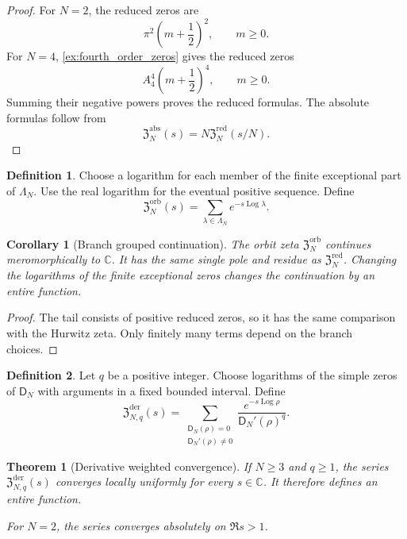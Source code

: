 \documentclass{aomart}
\newtheorem{theorem}{Theorem}[section]
\newtheorem{corollary}[corollary]{Corollary}
\theoremstyle{definition}
\newtheorem{definition}[definition]{Definition}
\theoremstyle{remark}
\newcommand{\CC}{\mathbb C}
\newcommand{\Dfun}{\mathsf D}
\newcommand{\Log}{\operatorname{Log}}
\begin{document}
\begin{proof}
For $N=2$, the reduced zeros are
\[
\pi^2\left(m+\frac12\right)^2,
\qquad m\geq0.
\]
For $N=4$, \cref{ex:fourth_order_zeros} gives the reduced zeros
\[
A_4^4\left(m+\frac12\right)^4,
\qquad m\geq0.
\]
Summing their negative powers proves the reduced formulas.  The absolute formulas follow from
\[
\mathfrak Z_N^{\mathrm{abs}}(s)
=
N\mathfrak Z_N^{\mathrm{red}}(s/N).
\]
\end{proof}

\begin{definition}\label{def:branch_orbit_zeta}
Choose a logarithm for each member of the finite exceptional part of $\Lambda_N$.  Use the real logarithm for the eventual positive sequence.  Define
\[
\mathfrak Z_N^{\mathrm{orb}}(s)
=
\sum_{\lambda\in\Lambda_N}e^{-s\Log\lambda}.
\]
\end{definition}

\begin{corollary}[Branch grouped continuation]\label{cor:branch_grouped_continuation}
The orbit zeta $\mathfrak Z_N^{\mathrm{orb}}$ continues meromorphically to $\CC$.  It has the same single pole and residue as $\mathfrak Z_N^{\mathrm{red}}$.  Changing the logarithms of the finite exceptional zeros changes the continuation by an entire function.
\end{corollary}

\begin{proof}
The tail consists of positive reduced zeros, so it has the same comparison with the Hurwitz zeta.  Only finitely many terms depend on the branch choices.
\end{proof}

\begin{definition}\label{def:derivative_weighted_zeta}
Let $q$ be a positive integer.  Choose logarithms of the simple zeros of $\Dfun_N$ with arguments in a fixed bounded interval.  Define
\[
\mathfrak Z_{N,q}^{\mathrm{der}}(s)
=
\sum_{\substack{\Dfun_N(\rho)=0\\ \Dfun_N'(\rho)\ne0}}
\frac{e^{-s\Log\rho}}{\Dfun_N'(\rho)^q}.
\]
\end{definition}

\begin{theorem}[Derivative weighted convergence]\label{thm:derivative_weighted_convergence}
If $N\geq3$ and $q\geq1$, the series $\mathfrak Z_{N,q}^{\mathrm{der}}(s)$ converges locally uniformly for every $s\in\CC$.  It therefore defines an entire function.

For $N=2$, the series converges absolutely on $\Re s>1$.
\end{theorem}
\end{document}
